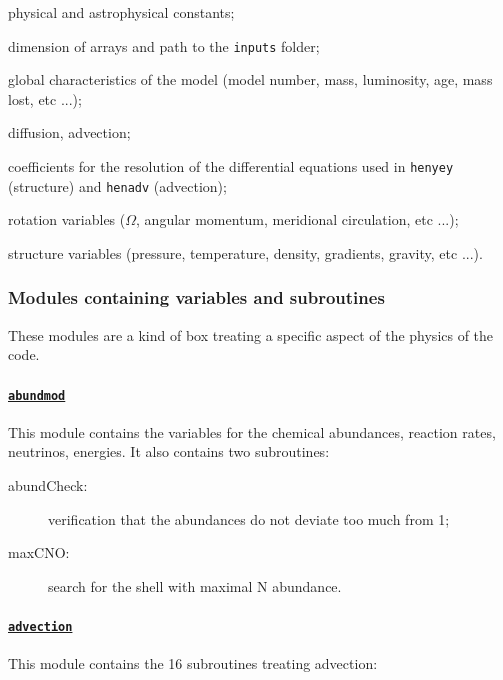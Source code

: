 \documentclass[11pt]{article}
\begin{document}
 \begin{description}[]
 \item[const:] physical and astrophysical constants;
 \item[evol:] dimension of arrays and path to the \texttt{inputs} folder;
 \item[caramodele:] global characteristics of the model (model number, mass, luminosity, age, mass lost, etc ...); 
 \item[diffadvmod:] diffusion, advection; 
 \item[equadiffmod:] coefficients for the resolution of the differential equations used in {\tt henyey} (structure) and {\tt henadv} (advection); 
 \item[rotmod:] rotation variables ($\Omega$, angular momentum, meridional circulation, etc ...); 
 \item[strucmod:] structure variables (pressure, temperature, density, gradients, gravity, etc ...).
 \end{description}

\subsubsection{Modules containing variables and subroutines}
These modules are a kind of box treating a specific aspect of the physics of the code.

\paragraph{\underline{\texttt{abundmod}}}
This module contains the variables for the chemical abundances, reaction rates, neutrinos, energies. It also contains two subroutines:
 \begin{description}
   \item[abundCheck:] verification that the abundances do not deviate too much from 1;
   \item[maxCNO:] search for the shell with maximal N abundance.
 \end{description}

\paragraph{\underline{\texttt{advection}}}
This module contains the 16 subroutines treating advection:
\end{document}
